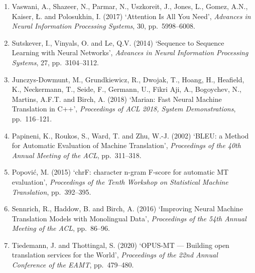 \documentclass[12pt,a4paper]{article}
\begin{document}
\begin{enumerate}
    \item Vaswani, A., Shazeer, N., Parmar, N., Uszkoreit, J., Jones, L., Gomez, A.N., Kaiser, \L. and Polosukhin, I. (2017) `Attention Is All You Need', \emph{Advances in Neural Information Processing Systems}, 30, pp.~5998--6008.
    
    \item Sutskever, I., Vinyals, O. and Le, Q.V. (2014) `Sequence to Sequence Learning with Neural Networks', \emph{Advances in Neural Information Processing Systems}, 27, pp.~3104--3112.
    
    \item Junczys-Dowmunt, M., Grundkiewicz, R., Dwojak, T., Hoang, H., Heafield, K., Neckermann, T., Seide, F., Germann, U., {Fikri Aji}, A., Bogoychev, N., Martins, A.F.T. and Birch, A. (2018) `Marian: Fast Neural Machine Translation in C++', \emph{Proceedings of ACL 2018, System Demonstrations}, pp.~116--121.
    
    \item Papineni, K., Roukos, S., Ward, T. and Zhu, W.-J. (2002) `BLEU: a Method for Automatic Evaluation of Machine Translation', \emph{Proceedings of the 40th Annual Meeting of the ACL}, pp.~311--318.
    
    \item Popovi\'{c}, M. (2015) `chrF: character n-gram F-score for automatic MT evaluation', \emph{Proceedings of the Tenth Workshop on Statistical Machine Translation}, pp.~392--395.
    
    \item Sennrich, R., Haddow, B. and Birch, A. (2016) `Improving Neural Machine Translation Models with Monolingual Data', \emph{Proceedings of the 54th Annual Meeting of the ACL}, pp.~86--96.
    
    \item Tiedemann, J. and Thottingal, S. (2020) `OPUS-MT --- Building open translation services for the World', \emph{Proceedings of the 22nd Annual Conference of the EAMT}, pp.~479--480.
\end{enumerate}
\end{document}
